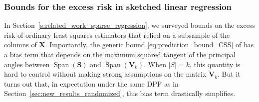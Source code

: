 \documentclass[twoside,11pt]{book}
\newtheorem{proposition}{Proposition}
\numberwithin{theorem}{chapter}
\numberwithin{definition}{chapter}
\numberwithin{proposition}{chapter}
\numberwithin{corollary}{chapter}
\numberwithin{example}{chapter}
\numberwithin{lemma}{chapter}
\DeclareMathOperator{\Span}{\mathrm{Span}}
\DeclareMathOperator{\DPP}{\mathrm{DPP}}
\DeclareMathOperator{\eff}{\mathrm{eff}}
\DeclareMathOperator{\EX}{\mathbb{E}}
\begin{document}
\subsubsection{Bounds for the excess risk in sketched linear regression}
\label{sec:bounds_for_regression_under_dpp}

 In Section~\ref{s:related_work_sparse_regression}, we surveyed bounds on the excess risk of ordinary least squares estimators that relied on a subsample of the columns of $\bm{X}$.
Importantly, the generic bound \eqref{eq:prediction_bound_CSS} of \cite{LiHa18} has a bias term that depends on the maximum squared tangent of the principal angles between $\Span(\bm{S})$ and $\Span(\bm{V}_k)$. When $|S| = k$, this quantity is hard to control without making strong assumptions on the matrix $\bm{V}_{k}$.
But it turns out that, in expectation under the same DPP as in Section~\ref{sec:new_results_randomized}, this bias term drastically simplifies.
\end{document}
